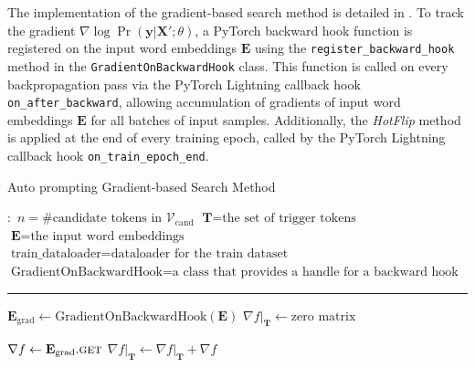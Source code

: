 The implementation of the gradient-based search method is detailed in . To track the gradient $\nabla \log \Pr(\textbf{y} | \textbf{X}'; \theta)$, a PyTorch backward hook function is registered on the input word embeddings $\textbf{E}$ using the \texttt{register\_backward\_hook} method in the \texttt{GradientOnBackwardHook} class. This function is called on every backpropagation pass via the PyTorch Lightning callback hook \texttt{on\_after\_backward}, allowing accumulation of gradients of input word embeddings $\textbf{E}$ for all batches of input samples. Additionally, the \textit{HotFlip} method is applied at the end of every training epoch, called by the PyTorch Lightning callback hook \texttt{on\_train\_epoch\_end}.

\begin{algorithm}
\caption{Auto prompting Gradient-based Search Method} \label{alg:auto-hotflip}
\begin{algorithmic}[1]
\small
\Require $\boldsymbol{:}$ 
\newline $n = \text{\# candidate tokens in $\mathcal{V}_{\text{cand}}$}$ 
\newline $\textbf{T} = \text{the set of trigger tokens}$
\newline $\textbf{E} = \text{the input word embeddings}$
\newline $\text{train\_dataloader} = \text{dataloader for the train dataset}$
\newline $\text{GradientOnBackwardHook} = \text{a class that provides a handle for a backward hook}$
\vspace{0.3em}
\hrule
\vspace{0.3em}

\State $\textbf{E}_\text{grad} \gets \text{GradientOnBackwardHook}(\textbf{E})$
{\color{mylightgrey}}
\State $\nabla f|_{\textbf{T}} \gets \text{zero matrix}$
{\color{mylightgrey}}

\State $\nabla f \gets \textbf{E}_\text{grad}.\Call{\text{get}}{}$
{\color{mylightgrey}}
\State $\nabla f|_{\textbf{T}} \gets \text{$\nabla f|_{\textbf{T}} + \nabla f$}$
{\color{mylightgrey}}
\EndFunction


\end{algorithmic}
\end{algorithm}
